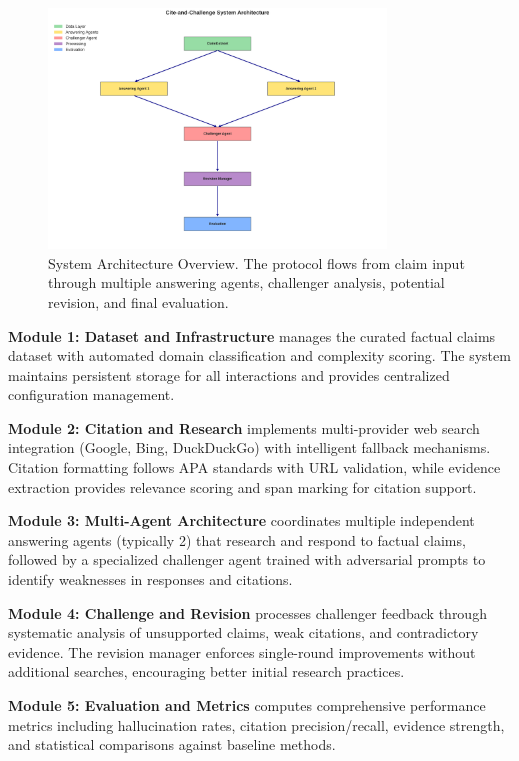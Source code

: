 \documentclass{article}
\begin{document}
\begin{figure}[htbp]
\centering
\includegraphics[width=0.8\textwidth]{figures/system_architecture.png}
\caption{System Architecture Overview. The protocol flows from claim input through multiple answering agents, challenger analysis, potential revision, and final evaluation.}
\label{fig:architecture}
\end{figure}

\textbf{Module 1: Dataset and Infrastructure} manages the curated factual claims dataset with automated domain classification and complexity scoring. The system maintains persistent storage for all interactions and provides centralized configuration management.

\textbf{Module 2: Citation and Research} implements multi-provider web search integration (Google, Bing, DuckDuckGo) with intelligent fallback mechanisms. Citation formatting follows APA standards with URL validation, while evidence extraction provides relevance scoring and span marking for citation support.

\textbf{Module 3: Multi-Agent Architecture} coordinates multiple independent answering agents (typically 2) that research and respond to factual claims, followed by a specialized challenger agent trained with adversarial prompts to identify weaknesses in responses and citations.

\textbf{Module 4: Challenge and Revision} processes challenger feedback through systematic analysis of unsupported claims, weak citations, and contradictory evidence. The revision manager enforces single-round improvements without additional searches, encouraging better initial research practices.

\textbf{Module 5: Evaluation and Metrics} computes comprehensive performance metrics including hallucination rates, citation precision/recall, evidence strength, and statistical comparisons against baseline methods.
\end{document}
